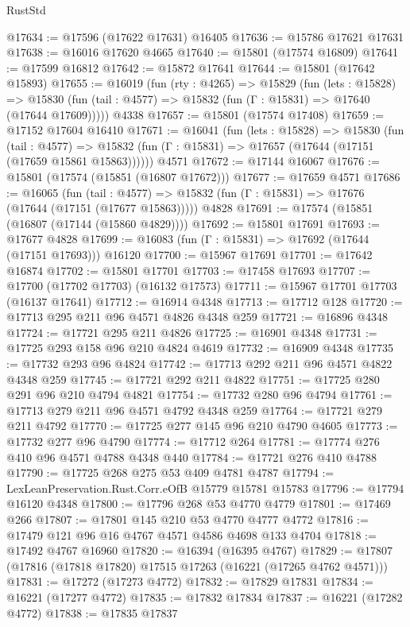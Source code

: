 \begin{lexlean}{RustStd}
\begin{coremodule}
@17634 := @17596 (@17622 @17631) @16405
@17636 := @15786 @17621 @17631
@17638 := @16016 @17620 @4665
@17640 := @15801 (@17574 @16809)
@17641 := @17599 @16812
@17642 := @15872 @17641
@17644 := @15801 (@17642 @15893)
@17655 := @16019
    (fun (rty : @4265) =>
    @15829
      (fun (lets : @15828) =>
      @15830 (fun (tail : @4577) => @15832 (fun (Γ : @15831) => @17640 (@17644 @17609)))))
    @4338
@17657 := @15801 (@17574 @17408)
@17659 := @17152 @17604 @16410
@17671 := @16041
    (fun (lets : @15828) =>
    @15830
      (fun (tail : @4577) =>
      @15832 (fun (Γ : @15831) => @17657 (@17644 (@17151 (@17659 @15861 @15863))))))
    @4571
@17672 := @17144 @16067
@17676 := @15801 (@17574 (@15851 (@16807 @17672)))
@17677 := @17659 @4571
@17686 := @16065
    (fun (tail : @4577) => @15832 (fun (Γ : @15831) => @17676 (@17644 (@17151 (@17677 @15863)))))
    @4828
@17691 := @17574 (@15851 (@16807 (@17144 (@15860 @4829))))
@17692 := @15801 @17691
@17693 := @17677 @4828
@17699 := @16083 (fun (Γ : @15831) => @17692 (@17644 (@17151 @17693))) @16120
@17700 := @15967 @17691
@17701 := @17642 @16874
@17702 := @15801 @17701
@17703 := @17458 @17693
@17707 := @17700 (@17702 @17703) (@16132 @17573)
@17711 := @15967 @17701 @17703 (@16137 @17641)
@17712 := @16914 @4348
@17713 := @17712 @128
@17720 := @17713 @295 @211 @96 @4571 @4826 @4348 @259
@17721 := @16896 @4348
@17724 := @17721 @295 @211 @4826
@17725 := @16901 @4348
@17731 := @17725 @293 @158 @96 @210 @4824 @4619
@17732 := @16909 @4348
@17735 := @17732 @293 @96 @4824
@17742 := @17713 @292 @211 @96 @4571 @4822 @4348 @259
@17745 := @17721 @292 @211 @4822
@17751 := @17725 @280 @291 @96 @210 @4794 @4821
@17754 := @17732 @280 @96 @4794
@17761 := @17713 @279 @211 @96 @4571 @4792 @4348 @259
@17764 := @17721 @279 @211 @4792
@17770 := @17725 @277 @145 @96 @210 @4790 @4605
@17773 := @17732 @277 @96 @4790
@17774 := @17712 @264
@17781 := @17774 @276 @410 @96 @4571 @4788 @4348 @440
@17784 := @17721 @276 @410 @4788
@17790 := @17725 @268 @275 @53 @409 @4781 @4787
@17794 := LexLeanPreservation.Rust.Corr.eOfB @15779 @15781 @15783
@17796 := @17794 @16120 @4348
@17800 := @17796 @268 @53 @4770 @4779
@17801 := @17469 @266
@17807 := @17801 @145 @210 @53 @4770 @4777 @4772
@17816 := @17479 @121 @96 @16 @4767 @4571 @4586 @4698 @133 @4704
@17818 := @17492 @4767 @16960
@17820 := @16394 (@16395 @4767)
@17829 := @17807 (@17816 (@17818 @17820) @17515 @17263 (@16221 (@17265 @4762 @4571)))
@17831 := @17272 (@17273 @4772)
@17832 := @17829 @17831
@17834 := @16221 (@17277 @4772)
@17835 := @17832 @17834
@17837 := @16221 (@17282 @4772)
@17838 := @17835 @17837

\end{coremodule}
\end{lexlean}
